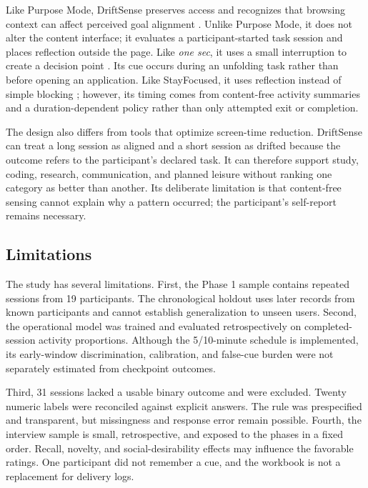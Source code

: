 \documentclass[12pt,a4paper]{article}
\newcommand{\citep}[1]{\parencite{#1}}
\begin{document}
Like Purpose Mode, DriftSense preserves access and recognizes that browsing context can affect perceived goal alignment \citep{lee2025purpose}. Unlike Purpose Mode, it does not alter the content interface; it evaluates a participant-started task session and places reflection outside the page. Like \textit{one sec}, it uses a small interruption to create a decision point \citep{gruning2023onesec}. Its cue occurs during an unfolding task rather than before opening an application. Like StayFocused, it uses reflection instead of simple blocking \citep{li2024stayfocused}; however, its timing comes from content-free activity summaries and a duration-dependent policy rather than only attempted exit or completion.

The design also differs from tools that optimize screen-time reduction. DriftSense can treat a long session as aligned and a short session as drifted because the outcome refers to the participant's declared task. It can therefore support study, coding, research, communication, and planned leisure without ranking one category as better than another. Its deliberate limitation is that content-free sensing cannot explain why a pattern occurred; the participant's self-report remains necessary.

\subsection{Limitations}

The study has several limitations. First, the Phase 1 sample contains repeated sessions from 19 participants. The chronological holdout uses later records from known participants and cannot establish generalization to unseen users. Second, the operational model was trained and evaluated retrospectively on completed-session activity proportions. Although the 5/10-minute schedule is implemented, its early-window discrimination, calibration, and false-cue burden were not separately estimated from checkpoint outcomes.

Third, 31 sessions lacked a usable binary outcome and were excluded. Twenty numeric labels were reconciled against explicit answers. The rule was prespecified and transparent, but missingness and response error remain possible. Fourth, the interview sample is small, retrospective, and exposed to the phases in a fixed order. Recall, novelty, and social-desirability effects may influence the favorable ratings. One participant did not remember a cue, and the workbook is not a replacement for delivery logs.
\end{document}
